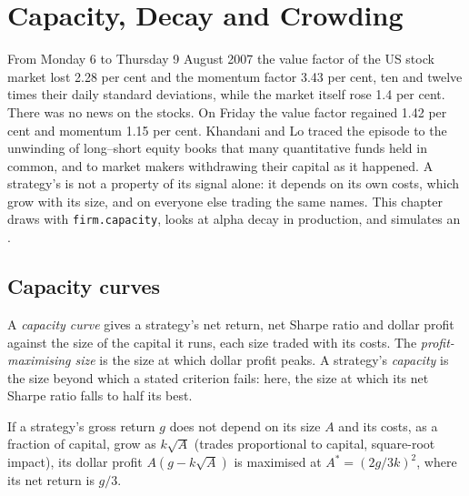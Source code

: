 \chapter{Capacity, Decay and Crowding}\label{ch:rs:capacity-decay-and-crowding}

From Monday 6 to Thursday 9 August 2007 the value factor of the US stock market lost 2.28 per cent and the momentum factor 3.43 per cent, ten and twelve times
their daily standard deviations, while the market itself rose 1.4 per cent. There was no news on the stocks. On Friday the value factor regained 1.42 per cent
and momentum 1.15 per cent. Khandani and Lo traced the episode to the unwinding of long--short equity books that many quantitative funds held in common, and to
market makers withdrawing their capital as it happened. A strategy's  is not a property of its signal alone: it depends on its own costs, which grow
with its size, and on everyone else trading the same names. This chapter draws  with \texttt{firm.capacity}, looks at alpha decay in production,
and simulates an .

\section{Capacity curves}

\begin{definition}\label{def:rs:capacity-decay-and-crowding:capacity}
A \emph{capacity curve} gives a strategy's net return, net Sharpe ratio and dollar profit against the size of the capital it runs, each
size traded with its costs. The \emph{profit-maximising size} is the size at which dollar profit peaks. A strategy's
\emph{capacity} is the size beyond which a stated criterion fails: here, the size at which its net Sharpe ratio falls to half its best.
\end{definition}

\begin{proposition}\label{prop:rs:capacity-decay-and-crowding:size}
If a strategy's gross return $g$ does not depend on its size $A$ and its costs, as a fraction of capital, grow as $k\sqrt A$ (trades proportional to capital,
square-root impact), its dollar profit $A(g - k\sqrt A)$ is maximised at $A^* = (2g/3k)^2$, where its net return is $g/3$.
\end{proposition}

